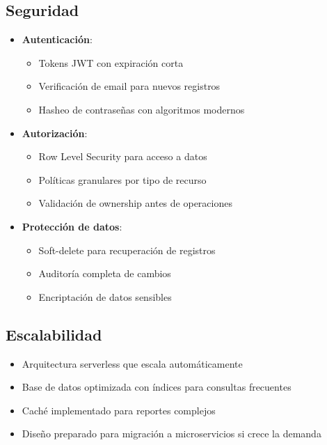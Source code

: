 \subsection*{Seguridad}
\begin{itemize}
    \item \textbf{Autenticación}:
    \begin{itemize}
        \item Tokens JWT con expiración corta
        \item Verificación de email para nuevos registros
        \item Hasheo de contraseñas con algoritmos modernos
    \end{itemize}
    \item \textbf{Autorización}:
    \begin{itemize}
        \item Row Level Security para acceso a datos
        \item Políticas granulares por tipo de recurso
        \item Validación de ownership antes de operaciones
    \end{itemize}
    \item \textbf{Protección de datos}:
    \begin{itemize}
        \item Soft-delete para recuperación de registros
        \item Auditoría completa de cambios
        \item Encriptación de datos sensibles
    \end{itemize}
\end{itemize}

\subsection*{Escalabilidad}
\begin{itemize}
    \item Arquitectura serverless que escala automáticamente
    \item Base de datos optimizada con índices para consultas frecuentes
    \item Caché implementado para reportes complejos
    \item Diseño preparado para migración a microservicios si crece la demanda
\end{itemize}
